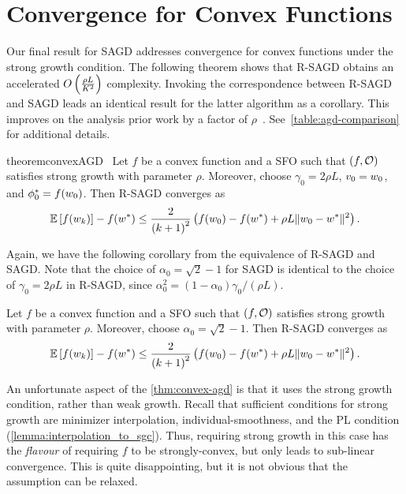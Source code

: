 \section{Convergence for Convex Functions}\label{sec:agd-convex}

Our final result for SAGD addresses convergence for convex functions under the strong growth condition. 
The following theorem shows that R-SAGD obtains an accelerated \( O\rbr{\frac{\rho L}{K^2}} \) complexity.
Invoking the correspondence between R-SAGD and SAGD leads an identical result for the latter algorithm as a corollary.
This improves on the analysis prior work by a factor of \( \rho \)~\citep[Theorem 2]{vaswani2019fast}. 
See~\autoref{table:agd-comparison} for additional details.

\begin{restatable}{theorem}{convexAGD}~\label{thm:convex-agd}
    Let \( f \) be a convex function and \oracle{} a SFO such that \( \rbr{f, \oracle{}} \) satisfies strong growth with parameter \( \rho \).
    Moreover, choose \( \gamma_0 = 2 \rho L \), \( v_0 = \w_0 \), and \( \phi_0^* = f(\w_0) \).
    Then R-SAGD converges as  
    \[ \E\sbr{f(\wk)} - f(\wopt) \leq \frac{2}{\rbr{k+1}^2}\rbr{f(\w_0) - f(\wopt) + \rho L \norm{\w_0 - \wopt}^2 }. \]
\end{restatable}

Again, we have the following corollary from the equivalence of R-SAGD and SAGD. 
Note that the choice of \( \alpha_0 = \sqrt{2} - 1 \) for SAGD is identical to the choice of \( \gamma_0 = 2 \rho L \) in R-SAGD, since \( \alpha_0^2 = (1 - \alpha_0) \gamma_0 / (\rho L) \).

\begin{corollary}
    Let \( f \) be a convex function and \oracle{} a SFO such that \( \rbr{f, \oracle{}} \) satisfies strong growth with parameter \( \rho \).
    Moreover, choose \( \alpha_0 = \sqrt{2} - 1 \).
    Then R-SAGD converges as  
    \[ \E\sbr{f(\wk)} - f(\wopt) \leq \frac{2}{\rbr{k+1}^2}\rbr{f(\w_0) - f(\wopt) + \rho L \norm{\w_0 - \wopt}^2 }. \]
\end{corollary}

 An unfortunate aspect of the \autoref{thm:convex-agd} is that it uses the strong growth condition, rather than weak growth.
 Recall that sufficient conditions for strong growth are minimizer interpolation, individual-smoothness, and the PL condition (\autoref{lemma:interpolation_to_sgc}). 
 Thus, requiring strong growth in this case has the \emph{flavour} of requiring \( f \) to be strongly-convex, but only leads to sub-linear convergence.
This is quite disappointing, but it is not obvious that the assumption can be relaxed.


